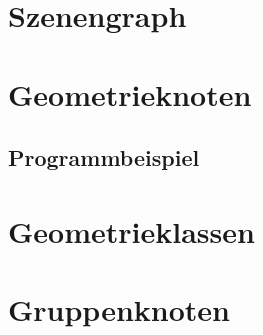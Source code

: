 \section{Szenengraph}

\section{Geometrieknoten}
\subsection{Programmbeispiel}

\section{Geometrieklassen}

\section{Gruppenknoten}





